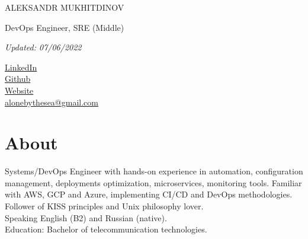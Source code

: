 \documentclass[11pt]{letter}
\newcommand{\forceindent}{\leavevmode{\parindent=1em\indent} %
}
\begin{document}
\begin{spacing}{2}
    {\centerline{{\huge \vphantom{Name}ALEKSANDR MUKHITDINOV}}}
    {\centerline{\large \vphantom{Position}DevOps Engineer, SRE (Middle)}}
    {\centerline{\textit{Updated: 07/06/2022}}}
\end{spacing}

{\setlength{\columnsep}{-0.9cm}\begin{multicols}{4}
    \begin{spacing}{2}\rmfamily
    \large{
        \vphantom{contacts}
        \faLinkedin \href{https://www.linkedin.com/in/aleksandr-mukhitdinov/}{\vphantom{LinkedIn} LinkedIn} \\
        \columnbreak
        \faGithubAlt \href{https://github.com/alonebythesea}{\vphantom{GitHub} Github} \\
        \columnbreak
        \faLink \href{https://crysh.cc}{\vphantom{Website} Website} \\
        \columnbreak
        \faEnvelope \href{mailto:alonebythesea@gmail.com}{\vphantom{Email} alonebythesea@gmail.com} \\
        \columnbreak
    }
  \end{spacing}\end{multicols}}

\section*{About\vphantom{about}}


\forceindent Systems/DevOps Engineer with hands-on experience in automation, configuration management, deployments optimization, microservices, monitoring tools. Familiar with AWS, GCP and Azure, implementing CI/CD and DevOps methodologies. Follower of KISS principles and Unix philosophy lover. \\

\forceindent Speaking English (B2) and Russian (native). \\
\forceindent Education: Bachelor of telecommunication technologies.

\end{document}
